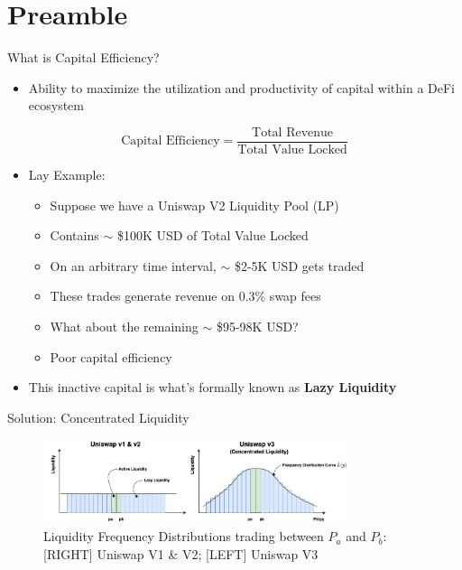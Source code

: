 \documentclass[10pt,xcolor=svgnames]{beamer} %
\begin{document}
\section{Preamble}

\begin{frame}{What is Capital Efficiency?} 

\begin{itemize}
  \item Ability to maximize the utilization and productivity of capital within a DeFi ecosystem
\end{itemize}

 \[ \textrm{Capital Efficiency} = \frac{\textrm{Total Revenue}}{\textrm{Total Value Locked}} \]

\begin{itemize} 
\item Lay Example:
     \begin{itemize} 
        \item Suppose we have a Uniswap V2 Liquidity Pool (LP)
        \item Contains $\sim$ \$100K USD of Total Value Locked 
        \item On an arbitrary time interval, $\sim$ \$2-5K USD gets traded 
        \item These trades generate revenue on 0.3\% swap fees
        \item What about the remaining $\sim$ \$95-98K USD?
        \item Poor capital efficiency 
     \end{itemize}
\item This inactive capital is what's formally known as \textbf{Lazy Liquidity}    
\end{itemize}

\end{frame}

\begin{frame}{Solution: Concentrated Liquidity} 

\begin{figure}[h!]
\includegraphics[width=3.5in]{img/concentrated_liquidity.png}
\caption{Liquidity Frequency Distributions trading between $P_{a}$ and $P_{b}$: [RIGHT] Uniswap V1 \& V2; [LEFT] Uniswap V3} 
\label{fig:uniswap_v3}
\end{figure}

\end{frame}
\end{document}
